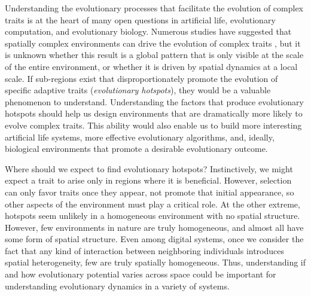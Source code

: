 Understanding the evolutionary processes that facilitate the evolution of complex traits is at the heart of many open questions in artificial life, evolutionary computation, and evolutionary biology. Numerous studies have suggested that spatially complex environments can drive the evolution of complex traits \citep{doebeli_speciation_2003,wagner_behavioral_2013,dolson_spatial_2017}, but it is unknown whether this result is a global pattern that is only visible at the scale of the entire environment, 
or whether it is driven by spatial dynamics at a local scale. If sub-regions exist that disproportionately promote the evolution of specific adaptive traits (\textit{evolutionary hotspots}), they would be a valuable phenomenon to understand. Understanding the factors that produce evolutionary hotspots should help us design environments that are dramatically more likely to evolve complex traits. This ability would also enable us to build more interesting artificial life systems, more effective evolutionary algorithms, and, ideally, biological environments that promote a desirable evolutionary outcome.

Where should we expect to find evolutionary hotspots? Instinctively, we might expect a trait to arise only in regions where it is beneficial. However, selection can only favor traits once they appear, not promote that initial appearance, so other aspects of the environment must play a critical role.  At the other extreme, hotspots seem unlikely in a homogeneous environment with no spatial structure.
However, few environments in nature are truly homogeneous, and almost all have some form of spatial structure. Even among digital systems, once we consider the fact that any kind of interaction between neighboring individuals introduces spatial heterogeneity, few are truly spatially homogeneous. Thus, understanding if and how evolutionary potential varies across space could be important for understanding evolutionary dynamics in a variety of systems.

